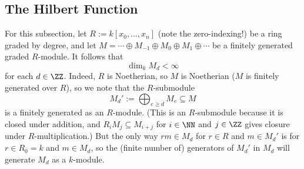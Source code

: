 \subsection{The Hilbert Function}
For this subsection, let $R:=k[x_0,\ldots,x_n]$ (note the zero-indexing!) be a ring graded by degree, and let $M=\cdots\oplus M_{-1}\oplus M_0\oplus M_1\oplus\cdots$ be a finitely generated graded $R$-module. It follows that
\[\dim_kM_d<\infty\]
for each $d\in\ZZ$. Indeed, $R$ is Noetherian, so $M$ is Noetherian ($M$ is finitely generated over $R$), so we note that the $R$-submodule
\[M_d':=\bigoplus_{e\ge d}M_e\subseteq M\]
is a finitely generated as an $R$-module. (This is an $R$-submodule because it is closed under addition, and $R_iM_j\subseteq M_{i+j}$ for $i\in\NN$ and $j\in\ZZ$ gives closure under $R$-multiplication.) But the only way $rm\in M_d$ for $r\in R$ and $m\in M_d'$ is for $r\in R_0=k$ and $m\in M_d$, so the (finite number of) generators of $M_d'$ in $M_d$ will generate $M_d$ as a $k$-module.

